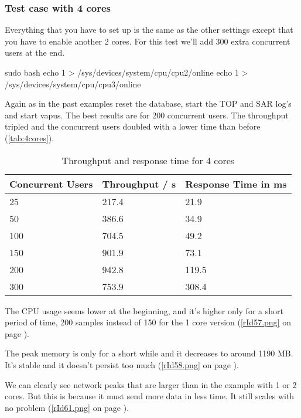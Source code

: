 \subsubsection{Test case with 4 cores}
Everything that you have to set up is the same as the other settings except that you have to enable another 2 cores. For this test we'll add 300 extra concurrent users at the end.
\begin{codelisting}
sudo bash
echo 1 > /sys/devices/system/cpu/cpu2/online
echo 1 > /sys/devices/system/cpu/cpu3/online
\end{codelisting}
Again as in the past examples reset the database, start the TOP and SAR log's and start \gls{vapus}.
The best results are for 200 concurrent users. The throughput tripled and the concurrent users doubled with a lower time than before (\autoref{tab:4cores}).
\begin{table}[ht!]\begin{center}
\caption{Throughput and response time for 4 cores}\label{tab:4cores}
\begin{tabular}{|p{2.2cm}|p{2.2cm}|p{2.2cm}|}\hline\rowcolor{myLightGreen}\arrayrulecolor{myLightGreen}
 {\bf\color{white} Concurrent Users} & {\bf\color{white} Throughput / s} & {\bf\color{white} Response Time in ms} \\ \hline 
 25 & 217.4 & 21.9 \\ \hline 
 50 & 386.6 & 34.9 \\ \hline 
 100 & 704.5 & 49.2 \\ \hline 
 150 & 901.9 & 73.1 \\ \hline \rowcolor{rowhighlight}
 200 & 942.8 & 119.5 \\ \hline 
 300 & 753.9 & 308.4 \\ \hline 
\end{tabular}\end{center}
\end{table}

The CPU usage seems lower at the beginning, and it's higher only for a short period of time, 200 samples instead of 150 for the 1 core version (\autoref{rId57.png} on page \pageref{rId57.png}).

The peak memory is only for a short while and it decreases to around 1190 MB. It's stable and it doesn't persist too much (\autoref{rId58.png} on page \pageref{rId58.png}).

We can clearly see network peaks that are larger than in the example with 1 or 2 cores. But this is because it must send more data in less time. It still scales with no problem (\autoref{rId61.png} on page \pageref{rId61.png}).

